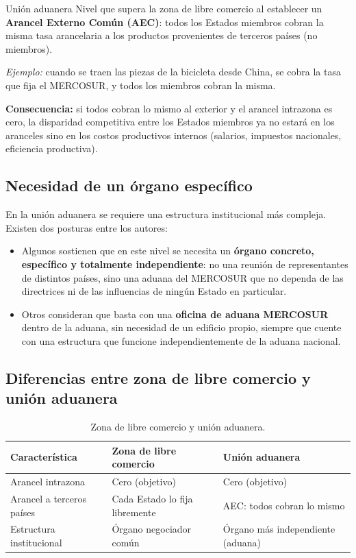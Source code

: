 \documentclass[12pt,oneside]{book}
\begin{document}
\begin{definition}{Unión aduanera}
Nivel que supera la zona de libre comercio al establecer un \textbf{Arancel Externo Común (AEC)}: todos los Estados miembros cobran la misma tasa arancelaria a los productos provenientes de terceros países (no miembros).

\medskip
\textit{Ejemplo:} cuando se traen las piezas de la bicicleta desde China, se cobra la tasa que fija el MERCOSUR, y todos los miembros cobran la misma.

\medskip
\textbf{Consecuencia:} si todos cobran lo mismo al exterior y el arancel intrazona es cero, la disparidad competitiva entre los Estados miembros ya no estará en los aranceles sino en los costos productivos internos (salarios, impuestos nacionales, eficiencia productiva).
\end{definition}

\subsection{Necesidad de un órgano específico}

En la unión aduanera se requiere una estructura institucional más compleja. Existen dos posturas entre los autores:

\begin{itemize}
    \item Algunos sostienen que en este nivel se necesita un \textbf{órgano concreto, específico y totalmente independiente}: no una reunión de representantes de distintos países, sino una aduana del MERCOSUR que no dependa de las directrices ni de las influencias de ningún Estado en particular.
    \item Otros consideran que basta con una \textbf{oficina de aduana MERCOSUR} dentro de la aduana, sin necesidad de un edificio propio, siempre que cuente con una estructura que funcione independientemente de la aduana nacional.
\end{itemize}

\subsection{Diferencias entre zona de libre comercio y unión aduanera}

\begin{table}[H]
\centering
\begin{tabularx}{\textwidth}{
    >{\raggedright\arraybackslash}p{}
    >{\raggedright\arraybackslash}X
    >{\raggedright\arraybackslash}X
}
\toprule
\textbf{Característica} & \textbf{Zona de libre comercio} & \textbf{Unión aduanera} \\
\midrule
Arancel intrazona & Cero (objetivo) & Cero (objetivo) \\
Arancel a terceros países & Cada Estado lo fija libremente & AEC: todos cobran lo mismo \\
Estructura institucional & Órgano negociador común & Órgano más independiente (aduana) \\
\bottomrule
\end{tabularx}
\caption{Zona de libre comercio y unión aduanera.}
\end{table}
\end{document}
